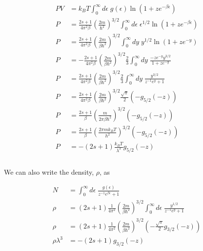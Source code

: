 \documentclass[]{article}
\begin{document}
\begin{equation}\label{eq:4}
\begin{aligned}
PV & =   k_B T \int_0^\infty d\epsilon \; g(\epsilon)  \ln( 1+ z e^{ - \beta\epsilon }) \\
P & = \frac{ 2s +1  }{4\pi^2 \beta} \left( \frac{ 2m }{ \hbar^2} \right)^{3/2} \int_0^\infty d\epsilon \;  \epsilon^{1/2}  \ln( 1+ z e^{ - \beta\epsilon }) \\
P  & = \frac{ 2s +1  }{4\pi^2 \beta} \left( \frac{ 2m }{ \beta \hbar^2} \right)^{3/2} \int_0^\infty dy\;  y^{1/2}  \ln( 1+ z e^{ - y }) \\
P  & =  - \frac{ 2s +1  }{4\pi^2 \beta} \left( \frac{ 2m }{ \beta \hbar^2} \right)^{3/2} \frac{2}{3} \int_0^\infty dy\; \frac{  - z e^{ -y }  y^{3/2}  }{ 1 + z e^{ -y }  } \\
P & =  \frac{ 2s +1  }{4\pi^2 \beta} \left( \frac{ 2m }{ \beta \hbar^2} \right)^{3/2} \frac{2}{3} \int_0^\infty dy\; \frac{   y^{3/2}  }{  z^{-1} e^{ y } +1   } \\
P  & =  \frac{ 2s +1  }{4\pi^2 \beta } \left( \frac{ 2m }{ \beta \hbar^2} \right)^{3/2} \frac{\sqrt{\pi }}{2} \left( -g_{5/2}(-z)  \right) \\
P  & =  \frac{ 2s +1  }{\beta } \left( \frac{ m }{ 2 \pi \beta \hbar^2} \right)^{3/2}  \left( -g_{5/2}(-z)  \right) \\
P  & =  \frac{ 2s +1  }{\beta } \left( \frac{ 2 \pi m k_B T}{  h^2 } \right)^{3/2}  \left( -g_{5/2}(-z)  \right) \\
P  & = - (2s +1 ) \frac{ k_B T }{ \lambda^3 }  g_{5/2}(-z) \\
\end{aligned}
\end{equation} \\

We can also write the density, $\rho$, as

\begin{equation}\label{eq:5}
\begin{aligned}
N & = \int_0^\infty d\epsilon \; \frac{ g(\epsilon) }{ z^{-1}e^{ \beta \epsilon}  + 1} \\
\rho & =  (2s +1 ) \frac{1}{4\pi^2} \left( \frac{ 2m }{ \beta \hbar^2} \right)^{3/2}  \int_0^\infty d\epsilon \; \frac{ y^{1/2} }{ z^{-1}e^{y}  + 1} \\
\rho & =  (2s +1 ) \frac{1}{4\pi^2} \left( \frac{ 2m }{ \beta \hbar^2} \right)^{3/2} \left( - \frac{ \sqrt{\pi}}{2} g_{3/2}(-z) \right) \\
\rho\lambda^3  & = - (2s +1 )  g_{3/2}(-z) \\
\end{aligned}
\end{equation} \\
\end{document}
